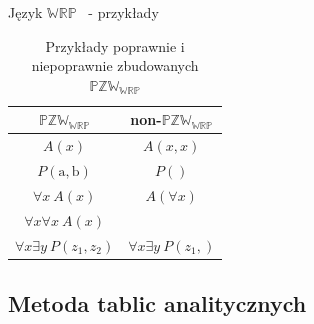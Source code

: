 \documentclass{beamer}
\newcommand {\PZWWRP} {\ensuremath{\mathbb{PZW_{WRP}}}}
\newcommand {\WRP} {\ensuremath{\mathbb{WRP}}}
\begin{document}




\begin{frame}{Język \WRP~ - przykłady}
\begin{table}[p]
\caption{Przykłady poprawnie i niepoprawnie zbudowanych \PZWWRP}
\begin{center}
\begin{tabular}{|c|c|}
\hline
\textbf{\PZWWRP} & \textbf{non-\PZWWRP}\\
\hline
$A(x)$ & $A(x,x)$\\
\hline
$P(\textrm{a},\textrm{b})$ & $P()$\\
\hline
$\forall x~A(x)$ & $A(\forall x)$\\
\cline {1-1}
$\forall x \forall x~ A(x)$&\\
\hline
$\forall x \exists y~ P(z_{1},z_{2})$& $\forall x \exists y~ P(z_{1},)$\\
\hline
\end{tabular}
\end{center}
\label{PrzykladyPZWWRP}
\end{table}
\end{frame}




\subsection{Metoda tablic analitycznych}
\end{document}
